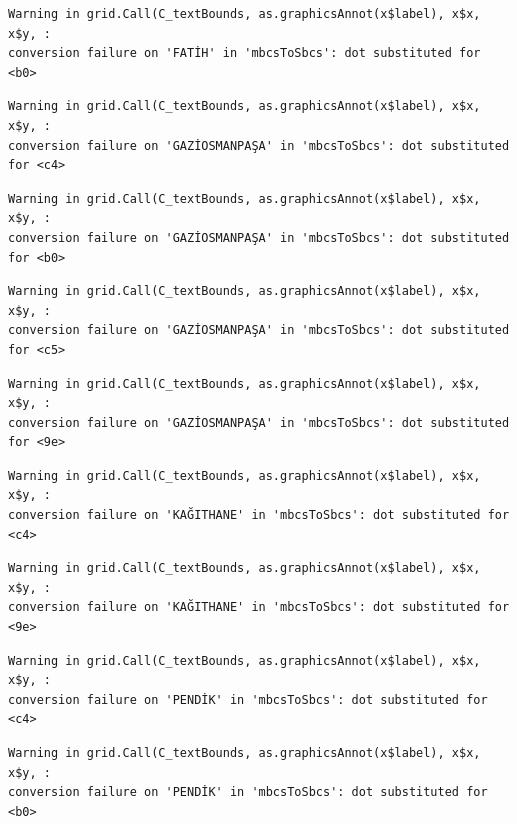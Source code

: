 \documentclass[
  11pt,
  a4paper,
  DIV=11,
  numbers=noendperiod]{scrartcl}
\begin{document}
\begin{verbatim}
Warning in grid.Call(C_textBounds, as.graphicsAnnot(x$label), x$x, x$y, :
conversion failure on 'FATİH' in 'mbcsToSbcs': dot substituted for <b0>
\end{verbatim}

\begin{verbatim}
Warning in grid.Call(C_textBounds, as.graphicsAnnot(x$label), x$x, x$y, :
conversion failure on 'GAZİOSMANPAŞA' in 'mbcsToSbcs': dot substituted for <c4>
\end{verbatim}

\begin{verbatim}
Warning in grid.Call(C_textBounds, as.graphicsAnnot(x$label), x$x, x$y, :
conversion failure on 'GAZİOSMANPAŞA' in 'mbcsToSbcs': dot substituted for <b0>
\end{verbatim}

\begin{verbatim}
Warning in grid.Call(C_textBounds, as.graphicsAnnot(x$label), x$x, x$y, :
conversion failure on 'GAZİOSMANPAŞA' in 'mbcsToSbcs': dot substituted for <c5>
\end{verbatim}

\begin{verbatim}
Warning in grid.Call(C_textBounds, as.graphicsAnnot(x$label), x$x, x$y, :
conversion failure on 'GAZİOSMANPAŞA' in 'mbcsToSbcs': dot substituted for <9e>
\end{verbatim}

\begin{verbatim}
Warning in grid.Call(C_textBounds, as.graphicsAnnot(x$label), x$x, x$y, :
conversion failure on 'KAĞITHANE' in 'mbcsToSbcs': dot substituted for <c4>
\end{verbatim}

\begin{verbatim}
Warning in grid.Call(C_textBounds, as.graphicsAnnot(x$label), x$x, x$y, :
conversion failure on 'KAĞITHANE' in 'mbcsToSbcs': dot substituted for <9e>
\end{verbatim}

\begin{verbatim}
Warning in grid.Call(C_textBounds, as.graphicsAnnot(x$label), x$x, x$y, :
conversion failure on 'PENDİK' in 'mbcsToSbcs': dot substituted for <c4>
\end{verbatim}

\begin{verbatim}
Warning in grid.Call(C_textBounds, as.graphicsAnnot(x$label), x$x, x$y, :
conversion failure on 'PENDİK' in 'mbcsToSbcs': dot substituted for <b0>
\end{verbatim}
\end{document}
